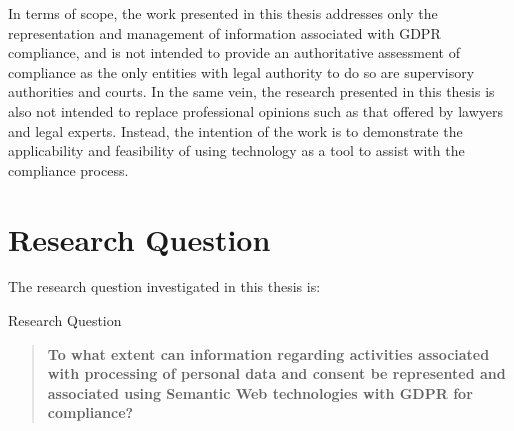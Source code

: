 In terms of scope, the work presented in this thesis addresses only the representation and management of information associated with GDPR compliance, and is not intended to provide an authoritative assessment of  compliance as the only entities with legal authority to do so are supervisory authorities and courts.
In the same vein, the research presented in this thesis is also not intended to replace professional opinions such as that offered by lawyers and legal experts.
Instead, the intention of the work is to demonstrate the applicability and feasibility of using technology as a tool to assist with the compliance process.

\section{Research Question}
The research question investigated in this thesis is:
\begin{framed}
\small{Research Question}
\begin{quote}
\textbf{To what extent can information regarding activities associated with processing of personal data and consent be represented and associated using Semantic Web technologies with GDPR for compliance?}
\end{quote}
\end{framed}

